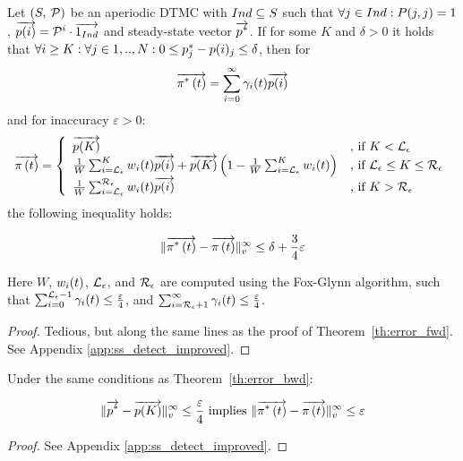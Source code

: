 \documentclass{entcs}
\begin{document}
		\begin{theorem}
			Let $\left( S,\: \mathcal{P} \right)$ be an aperiodic DTMC with $Ind \subseteq S$ such that $\forall j \in Ind : P(j,j) = 1$, $\overrightarrow{p(i)}=\mathcal{P}^{i} \cdot \overrightarrow{1_{Ind}}$ and steady-state vector $\overrightarrow{p^{*}}$. If for some $K$ and $\delta > 0$ it holds that $\forall i \geq K : \forall j \in 1,..,N : 0 \leq p^{*}_{j} - p(i)_{j} \leq \delta$, then for 
			{\small
			\[
				\overrightarrow{\pi^{*} \left( t \right)} = \sum_{i=0}^{\infty}\gamma_{i}(t) \overrightarrow{p(i)}
			\]
			}
			and for inaccuracy $\varepsilon > 0$:
			{\small
			\begin{equation}
				\displaystyle
				\overrightarrow{\pi \left( t \right) } = \left\{
				\begin{array}{ll}
					\overrightarrow{p(K)} & \text{, if } K < \mathcal{L}_{\epsilon}\\
					\frac{1}{W} \sum_{i=\mathcal{L}_{\epsilon}}^{K}w_{i}(t) \overrightarrow{p(i)} + \overrightarrow{p(K)} \left(1- \frac{1}{W} \sum_{i=\mathcal{L}_{\epsilon}}^{K}w_{i}(t) \right) & \text{, if } \mathcal{L}_{\epsilon} \leq K \leq \mathcal{R}_{\epsilon}\\
					\frac{1}{W} \sum_{i=\mathcal{L}_{\epsilon}}^{\mathcal{R}_{\epsilon}}w_{i}(t) \overrightarrow{p(i)} & \text{, if } K > \mathcal{R}_{\epsilon}\\
				\end{array}
				\right .
				\nonumber
			\end{equation}
			}
			the following inequality holds:
			{\small
			\begin{fframe}{0.5}{-0.0}
				\[
					\lVert   \overrightarrow{\pi^{*} \left( t \right)} - \overrightarrow{\pi \left( t \right) }   \rVert_{v}^{\infty} \leq \delta + \frac{3}{4} \varepsilon
				\]
			\end{fframe}
			}
			Here $W$, $w_{i}(t)$, $\mathcal{L}_{\epsilon}$, and $\mathcal{R}_{\epsilon}$ are computed using the Fox-Glynn algorithm, such that $\sum_{i=0}^{\mathcal{L}_{\epsilon}-1} \gamma_{i}(t) \leq \frac{\varepsilon}{4}$, and $\sum_{i=\mathcal{R}_{\epsilon}+1}^{\infty} \gamma_{i}(t) \leq \frac{\varepsilon}{4}$.
			\label{th:error_bwd}
		\end{theorem}
		{\small
			\begin{proof}
				Tedious, but along the same lines as the proof of Theorem~\ref{th:error_fwd}.\\ See Appendix \ref{app:ss_detect_improved}.
			\end{proof}
		}

		\begin{corollary}
			Under the same conditions as Theorem~\ref{th:error_bwd}:
			\begin{fframe}{0.8}{-0.2}
				\begin{equation}
					\lVert  \overrightarrow{p^{*}} - \overrightarrow{p(K)}  \rVert_{v}^{\infty} \leq \frac{\varepsilon}{4} \text{ implies } \lVert  \overrightarrow{\pi^{*} \left( t \right)} - \overrightarrow{\pi \left( t \right) }  \rVert_{v}^{\infty}\leq \varepsilon
					\label{eq:our_bwd_cor}
				\end{equation}
			\end{fframe}
			\label{cl:error_bwd}
		 \end{corollary}
		{\small
			\begin{proof}
				See Appendix \ref{app:ss_detect_improved}.
			\end{proof}
		}
		
\end{document}

